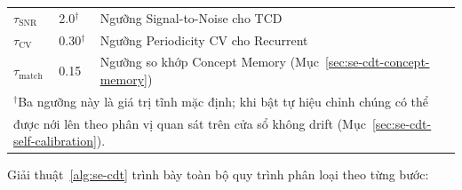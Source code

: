 \begin{table}[H]
\begin{tabular}{lll}
		$\tau_{\mathrm{SNR}}$ & 2.0$^{\dagger}$ & Ngưỡng Signal-to-Noise cho TCD \\
		$\tau_{\mathrm{CV}}$ & 0.30$^{\dagger}$ & Ngưỡng Periodicity CV cho Recurrent \\
		$\tau_{\mathrm{match}}$ & 0.15 & Ngưỡng so khớp Concept Memory (Mục~\ref{sec:se-cdt-concept-memory}) \\
		\hline
		\multicolumn{3}{l}{\footnotesize $^{\dagger}$Ba ngưỡng này là giá trị tĩnh mặc định; khi bật tự hiệu chỉnh chúng có thể} \\
		\multicolumn{3}{l}{\footnotesize được nới lên theo phân vị quan sát trên cửa sổ không drift (Mục~\ref{sec:se-cdt-self-calibration}).} \\
		\hline
	\end{tabular}
\end{table}

Giải thuật~\ref{alg:se-cdt} trình bày toàn bộ quy trình phân loại theo từng bước:


